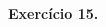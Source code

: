 \documentclass[oneside,12pt]{article}
\begin{document}
%

$\def\B{\ga{barranco}}
  \scalebox{0.6}{$
  \begin{array}{cccc}
  \B & \B & \B & \B \\
  \B & \B & \B & \B \\
  \B & \B & \B & \B \\
  \end{array}
  $}
$




\newpage


{\bf Exercício 15.}
\end{document}
